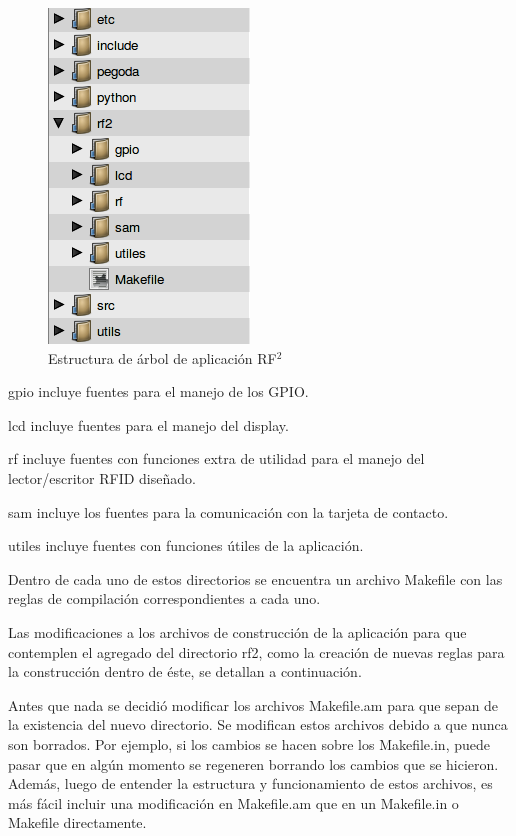 \begin{figure}[H]
\centering
  \begin{center}
  \includegraphics[scale=.4]{Imagenes/estructura_librfid.png} 
  \end{center}
  \caption{Estructura de árbol de aplicación RF$^{2}$}\label{est_RF2} 
\end{figure}

gpio incluye fuentes para el manejo de los GPIO.

lcd incluye fuentes para el manejo del display.

rf incluye fuentes con funciones extra de utilidad para el manejo del lector/escritor RFID diseñado.

sam incluye los fuentes para la comunicación con la tarjeta de contacto.

utiles incluye fuentes con funciones útiles de la aplicación.

\bigskip
Dentro de cada uno de estos directorios se encuentra un archivo Makefile con las reglas de compilación correspondientes a cada uno.

\bigskip
Las modificaciones a los archivos de construcción de la aplicación para que contemplen el agregado del directorio rf2, como la creación de nuevas reglas para la construcción dentro de éste, se detallan a continuación.

\bigskip
Antes que nada se decidió modificar los archivos Makefile.am para que sepan de la existencia del nuevo directorio. Se modifican estos archivos debido a que nunca son borrados. Por ejemplo, si los cambios se hacen sobre los Makefile.in, puede pasar que en algún momento se regeneren borrando los cambios que se hicieron. Además, luego de entender la estructura y funcionamiento de estos archivos, es más fácil incluir una modificación en Makefile.am que en un Makefile.in o Makefile directamente.

